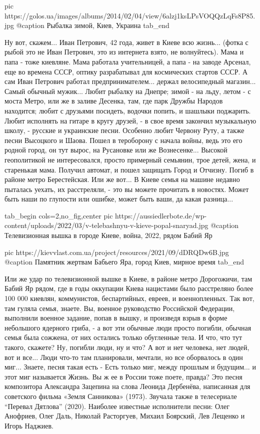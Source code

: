 		 pic https://golos.ua/images/albums/2014/02/04/view/6alzj1ksLPsVOQQzLqFs8P85.jpg
		 @caption Рыбалка зимой, Киев, Украина
  tab_end
\fi

Ну вот, скажем...  Иван Петрович, 42 года, живет в Киеве всю жизнь... (фотка с
рыбой это не Иван Петрович, это из интернета взято, не волнуйтесь). Мама и папа
- тоже киевляне.  Мама работала учительницей, а папа - на заводе Арсенал, еще
во времена СССР, оптику разрабатывал для космических стартов СССР.  А сам Иван
Петрович работал предпринимателем... держал велосипедный магазин... Самый
обычный мужик...  Любит рыбалку на Днепре; зимой - на льду, летом - с моста
Метро, или же в заливе Десенка, там, где парк Дружбы Народов находится; любит с
друзьями посидеть, водочки попить, и шашлыки поджарить.  Любит исполнять на
гитаре в кругу друзей, - в свое время закончил музыкальную школу, - русские и
украинские песни.  Особенно любит Червону Руту, а также песни Высоцкого и
Шаова.  Пошел в тероборону с начала войны, ведь это его родной город, он тут
вырос, на Русановке или же Вознесенке... Высокой геополитикой не интересовался,
просто примерный семьянин, трое детей, жена, и старенькая мама.  Получил
автомат, и пошел защищать Город и Отчизну. Погиб в районе метро Берестейская.
Или же вот... В Киеве семья на машине недавно пыталась уехать, их расстреляли,
- это вы можете прочитать в новостях. Может быть наши по глупости или ошибке,
может быть ваши, да какая разница... 

\ifcmt
  tab_begin cols=2,no_fig,center
     pic https://aussiedlerbote.de/wp-content/uploads/2022/03/v-telebashnyu-v-kieve-popal-snaryad.jpg
		 @caption Телевизионная вышка в городе Киеве, война, 2022, рядом Бабий Яр

		 pic https://kievvlast.com.ua/project/resources/2021/09/dDRQDw6B.jpg
		 @caption Памятник жертвам Бабьего Яра, город Киев, мирное время
  tab_end
\fi

Или же удар по телевизионной вышке в
Киеве, в районе метро Дорогожичи, там Бабий Яр рядом, где в годы оккупации
Киева нацистами было расстреляно более 100 000 киевлян, коммунистов,
беспартийных, евреев, и военнопленных. Так вот, там гуляла семья, знаете. Вы,
военное руководство Российской Федерации, выполнили военное задание, попав в
вышку, и произведя взрыв в форме небольшого ядерного гриба, - а вот эти обычные
люди просто погибли, обычная семья была сожжена, от них остались только
обугленные тела.  И что, что тут такого, скажете? Ну, погибли люди, ну и что? А
вот и нет человека, нет людей, вот и все... Люди что-то там планировали,
мечтали, но все оборвалось в один миг...  Знаете, песня такая есть - Есть
только миг, между прошлым и будущим...  и этот миг называется Жизнь. Вы ж ее в
России тоже поете, правда?  Это песня композитора Александра Зацепина на слова
Леонида Дербенёва, написанная для советского фильма «Земля Санникова» (1973).
Звучала также в телесериале \enquote{Перевал Дятлова} (2020). Наиболее
известные исполнители песни: Олег Анофриев, Олег Даль, Николай Расторгуев,
Михаил Боярский, Лев Лещенко и Игорь Наджиев.

